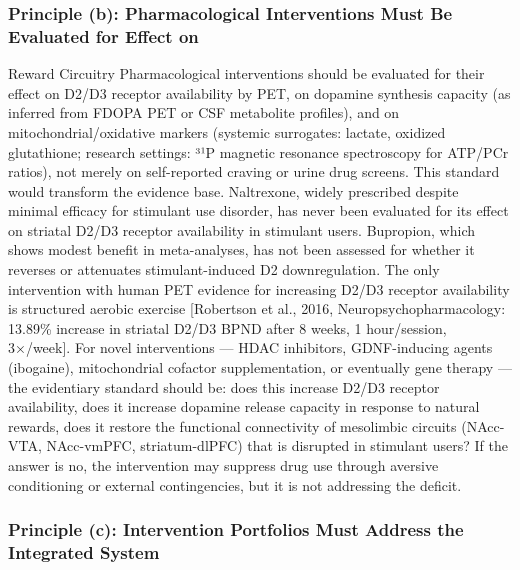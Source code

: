 \subsubsection{Principle (b): Pharmacological Interventions Must Be Evaluated for Effect on}\label{18_restoration-principle-b-pharmacological-interventions-must-be-evaluated-for-effect-on}

Reward Circuitry Pharmacological interventions should be evaluated for their effect on D2/D3 receptor availability by PET, on dopamine synthesis capacity (as inferred from FDOPA PET or CSF metabolite profiles), and on mitochondrial/oxidative markers (systemic surrogates: lactate, oxidized glutathione; research settings: ³¹P magnetic resonance spectroscopy for ATP/PCr ratios), not merely on self-reported craving or urine drug screens. This standard would transform the evidence base. Naltrexone, widely prescribed despite minimal efficacy for stimulant use disorder, has never been evaluated for its effect on striatal D2/D3 receptor availability in stimulant users. Bupropion, which shows modest benefit in meta-analyses, has not been assessed for whether it reverses or attenuates stimulant-induced D2 downregulation. The only intervention with human PET evidence for increasing D2/D3 receptor availability is structured aerobic exercise {[}Robertson et al., 2016, Neuropsychopharmacology: 13.89\% increase in striatal D2/D3 BPND after 8 weeks, 1 hour/session, 3×/week{]}. For novel interventions --- HDAC inhibitors, GDNF-inducing agents (ibogaine), mitochondrial cofactor supplementation, or eventually gene therapy --- the evidentiary standard should be: does this increase D2/D3 receptor availability, does it increase dopamine release capacity in response to natural rewards, does it restore the functional connectivity of mesolimbic circuits (NAcc-VTA, NAcc-vmPFC, striatum-dlPFC) that is disrupted in stimulant users? If the answer is no, the intervention may suppress drug use through aversive conditioning or external contingencies, but it is not addressing the deficit.

\subsubsection{Principle (c): Intervention Portfolios Must Address the Integrated System}\label{18_restoration-principle-c-intervention-portfolios-must-address-the-integrated-system}

